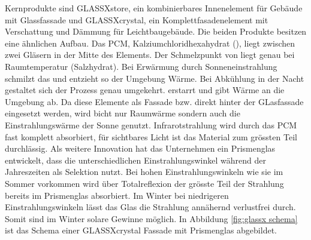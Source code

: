 \documentclass[11pt,a4paper]{scrartcl}
\begin{document}
Kernprodukte sind
GLASSX\circledR store, ein kombinierbares Innenelement für Gebäude mit
Glassfassade und GLASSX\circledR crystal, ein Komplettfasadenelement mit
Verschattung und Dämmung für Leichtbaugebäude. Die beiden Produkte besitzen eine
ähnlichen Aufbau. Das PCM, Kalziumchloridhexahydrat (),
liegt zwischen zwei Gläsern in der Mitte des Elements. Der Schmelzpunkt von
 liegt genau bei Raumtemperatur (Salzhydrat). Bei
Erwärmung durch Sonneneinstrahlung schmilzt das  und
entzieht so der Umgebung Wärme. Bei Abkühlung in der Nacht gestaltet sich der
Prozess genau umgekehrt.  erstarrt und gibt Wärme an die
Umgebung ab. Da diese Elemente als Fassade bzw. direkt hinter der GLasfassade
eingesetzt werden, wird bicht nur Raumwärme sondern auch die Einstrahlungswärme
der Sonne genutzt. Infrarotstrahlung wird durch das PCM fast komplett
absorbiert, für sichtbares Licht ist das Material zum grössten Teil durchlässig.
Als weitere Innovation hat das Unternehmen ein Prismenglas entwickelt, dass die
unterschiedlichen Einstrahlungswinkel während der Jahreszeiten als Selektion
nutzt. Bei hohen Einstrahlungswinkeln wie sie im Sommer vorkommen wird über
Totalreflexion der grösste Teil der Strahlung bereits im Prismenglas absorbiert.
Im Winter bei niedrigeren Einstrahlungswinkeln lässt das Glas die Strahlung
annähernd verlustfrei durch. Somit sind im Winter solare Gewinne möglich. In
Abbildung \ref{fig:glassx schema} ist das Schema einer GLASSX\circledR crystal
Fassade mit Prismenglas abgebildet. 
\end{document}

